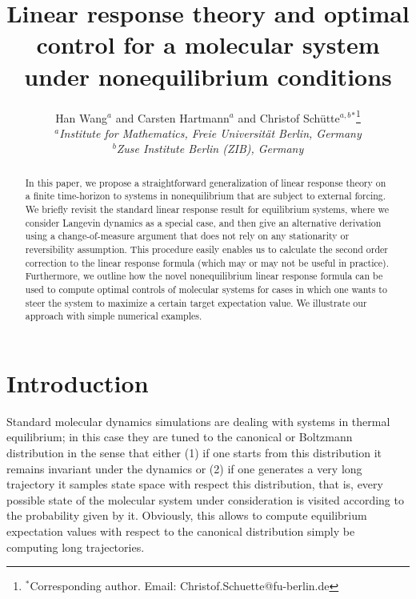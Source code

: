 \documentclass[]{tMPH2e}
\begin{document}
\title{Linear response theory and optimal control for a molecular system under nonequilibrium conditions}

\author{Han Wang$^{a}$ and Carsten Hartmann$^{a}$ and Christof Sch\"utte$^{a,b}$$^{\ast}$\thanks{$^\ast$Corresponding author. Email: Christof.Schuette@fu-berlin.de}\\\vspace{6pt}$^{a}${\em Institute for Mathematics, Freie Universit\"at Berlin, Germany}\\$^{b}${\em Zuse Institute Berlin (ZIB), Germany}}
  


\maketitle

\begin{abstract}
  In this paper, we propose a straightforward generalization of linear response theory on a finite time-horizon to systems in nonequilibrium that are subject to external forcing.  We briefly revisit the standard linear response result for equilibrium systems, where we consider Langevin dynamics as a special case, and then give an alternative derivation using a change-of-measure argument that does not rely on any stationarity or reversibility assumption. This procedure easily enables us to calculate the second order correction to the linear response formula (which may or may not be useful in practice). Furthermore, we outline how the novel nonequilibrium linear response formula can be used to compute optimal controls of molecular systems for cases in which one wants to steer the system to maximize a certain target expectation value. We illustrate our approach with simple numerical examples. 
\end{abstract}


\section{Introduction}

Standard molecular dynamics simulations are dealing with systems in thermal equilibrium; in this case they are tuned to the canonical or Boltzmann distribution in the sense that either (1) if one starts from this distribution it remains invariant under the dynamics or (2) if one generates a very long trajectory it samples state space with respect this distribution, that is, every possible state of the molecular system under consideration is visited according to the probability given by it.  Obviously, this allows to compute equilibrium expectation values with respect to the  canonical distribution simply be computing long trajectories. 
\end{document}
